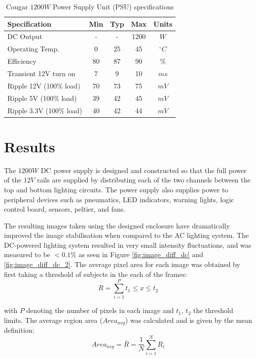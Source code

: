 \documentclass[fleqn,twoside,12pt]{report}
\begin{document}
\quad
\begin{table}[h]
	\centering
	\caption{Cougar $1200W$ Power Supply Unit (PSU) specifications}
	\label{tab:psu_spec}
	\begin{tabular}{l*{4}{c}}	
		\toprule 
		Specification & Min & Typ & Max & Units\\ 
		\midrule
		DC Output & - & - & 1200 & $W$ \\[6pt]
		Operating Temp. & 0 & 25 & 45 & $^{\circ}C$ \\[6pt]
		Efficiency & 80 & 87 & 90 & $\%$ \\[6pt]
		Transient 12V turn on & 7 & 9 & 10 & $ms$ \\[6pt]	
		Ripple 12V (100\% load) & 70 & 73 & 75 & $mV$ \\[6pt]
		Ripple 5V (100\% load) & 39 & 42 & 45 & $mV$ \\[6pt]
		Ripple 3.3V (100\% load) & 40 & 42 & 44 & $mV$ \\[6pt]
		
		\bottomrule
	\end{tabular}
\end{table}

\section{Results}

The $1200W$ DC power supply is designed and constructed so that the full power of the $12V$ rails are supplied by distributing each of the two channels between the top and bottom lighting circuits. The power supply also supplies power to peripheral devices such as pneumatics, LED indicators, warning lights, logic control board, sensors, peltier, and fans.

The resulting images taken using the designed enclosure have dramatically improved the image stabilisation when compared to the AC lighting system. The DC-powered lighting system resulted in very small intensity fluctuations, and was measured to be $<0.1\%$ as seen in Figure \ref{fig:image_diff_dc} and \ref{fig:image_diff_dc_2}. The average pixel area for each image was obtained by first taking a threshold of subjects in the each of the frames:
\begin{equation}
R = \sum_{i=1}^{P}t_1 \leq x \leq t_2
\end{equation}

with $P$ denoting the number of pixels in each image and $t_1$, $t_2$ the threshold limits. The average region area ($Area_{avg}$) was calculated and is given by the mean definition:
\begin{equation}
Area_{avg} = \bar{R} = \frac{1}{N}\sum_{i=1}^{N}R_i
\end{equation}
\end{document}
